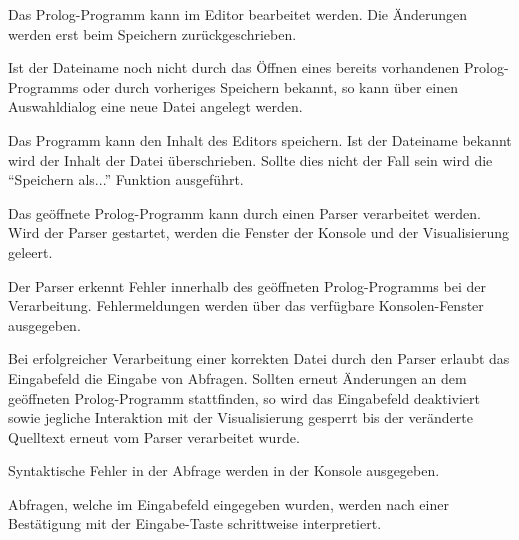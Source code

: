 \documentclass[parskip=full,11pt,twoside]{scrartcl}
\begin{document}
Das Prolog-Programm kann im Editor bearbeitet werden. Die Änderungen werden erst beim Speichern zurückgeschrieben.


Ist der Dateiname noch nicht durch das Öffnen eines bereits vorhandenen Prolog-Programms oder durch vorheriges Speichern bekannt, so kann über einen Auswahldialog eine neue Datei angelegt werden.


Das Programm kann den Inhalt des Editors speichern. Ist der Dateiname bekannt wird der Inhalt der Datei überschrieben. Sollte dies nicht der Fall sein wird die \enquote{Speichern als...} Funktion ausgeführt.


Das geöffnete Prolog-Programm kann durch einen Parser verarbeitet werden. Wird der Parser gestartet, werden die Fenster der Konsole und der Visualisierung geleert.


Der Parser erkennt Fehler innerhalb des geöffneten Prolog-Programms bei der Verarbeitung. Fehlermeldungen werden über das verfügbare Konsolen-Fenster ausgegeben.


Bei erfolgreicher Verarbeitung einer korrekten Datei durch den Parser erlaubt das Eingabefeld die Eingabe von Abfragen. Sollten erneut Änderungen an dem geöffneten Prolog-Programm stattfinden, so wird das Eingabefeld deaktiviert sowie jegliche Interaktion mit der Visualisierung gesperrt bis der veränderte Quelltext erneut vom Parser verarbeitet wurde.


Syntaktische Fehler in der Abfrage werden in der Konsole ausgegeben.


Abfragen, welche im Eingabefeld eingegeben wurden, werden nach einer Bestätigung mit der Eingabe-Taste schrittweise interpretiert.
\end{document}
